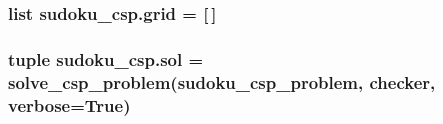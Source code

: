 \subsubsection[{grid}]{\setlength{\rightskip}{0pt plus 5cm}list sudoku\+\_\+csp.\+grid = \mbox{[}$\,$\mbox{]}}\label{namespacesudoku__csp_a96041389ba3daa8e9ab1671a86b8ee5e}
\hypertarget{namespacesudoku__csp_ad63795a911d014e95721a1018f8dde6e}{}
\subsubsection[{sol}]{\setlength{\rightskip}{0pt plus 5cm}tuple sudoku\+\_\+csp.\+sol = solve\+\_\+csp\+\_\+problem({\bf sudoku\+\_\+csp\+\_\+problem}, {\bf checker}, verbose=True)}\label{namespacesudoku__csp_ad63795a911d014e95721a1018f8dde6e}
